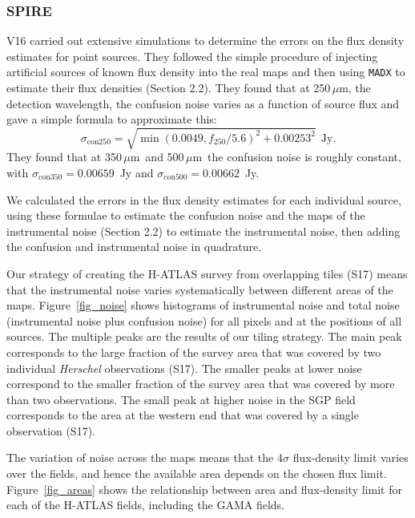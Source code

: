 \documentclass[a4paper,fleqn,usenatbib, twocolumn]{aastex61}
\def\mic{\,$\mu $m}
\begin{document}
\subsubsection{SPIRE}

V16 carried out extensive simulations to determine the
errors on the flux density estimates for point sources.
They followed the simple procedure of injecting artificial
sources of known flux density into the real maps and then
using {\tt MADX} to estimate their flux densities
(Section 2.2).  
They found that at 250\mic, the detection
wavelength, the confusion noise varies as a function
of source flux and gave a simple formula to approximate this:
\smallskip
\begin{equation}
\sigma_{\mathrm{con}250} = \sqrt{\min(0.0049,f_{250}/5.6)^2 +
  0.00253^2} \ \ \mathrm{Jy}.
\end{equation}
\smallskip
\noindent They found that 
at 350\mic\ and 500\mic\ the confusion noise 
is roughly constant, with $\sigma_{\mathrm{con}350} = 0.00659$~Jy and
$\sigma_{\mathrm{con}500} = 0.00662$~Jy.

We calculated the errors in the flux density estimates for each
individual source, using these formulae to estimate the confusion
noise and the maps of the instrumental noise (Section 2.2) to estimate
the instrumental noise, then adding the confusion and instrumental
noise in quadrature.


Our strategy of creating the H-ATLAS survey from overlapping tiles
(S17) means that the instrumental noise varies systematically between
different areas of the maps.  Figure~\ref{fig_noise} shows histograms
of instrumental noise and total noise (instrumental noise plus
confusion noise) for all pixels and at the positions of all sources.
The multiple peaks are the results of our tiling strategy. The main
peak corresponds to the large fraction of the survey area that was
covered by two individual {\it Herschel} observations (S17). The
smaller peaks at lower noise correspond to the smaller fraction of the
survey area that was covered by more than two observations. The small
peak at higher noise in the SGP field corresponds to the area at the
western end that was covered by a single observation (S17).

The variation of noise across the maps means that the 4$\sigma$
flux-density limit varies over the fields, and hence the available
area depends on the chosen flux limit. Figure~\ref{fig_areas}
shows the relationship between area and flux-density limit for each of
the H-ATLAS fields, including the GAMA fields.
\end{document}
